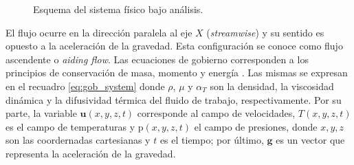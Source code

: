 \begin{figure}[H]
 \centering
 \caption{Esquema del sistema físico bajo análisis.} 
 \label{fig:sistem_domain}
\end{figure}

El flujo ocurre en la dirección paralela al eje $X$ (\textit{streamwise}) y su sentido es opuesto a la aceleración de la gravedad. Esta configuración se conoce como flujo ascendente o \textit{aiding flow}. Las ecuaciones de gobierno corresponden a los principios de conservación de masa, momento y energía \cite{zhou2024direct}. Las mismas se expresan en el recuadro \ref{eq:gob_system} donde $\rho$, $\mu$ y $\alpha_{T}$ son la densidad, la viscosidad dinámica y la difusividad térmica del fluido de trabajo, respectivamente. Por su parte, la variable $\mathbf{u}(x,y,z,t)$ corresponde al campo de velocidades, $T(x,y,z,t)$ es el campo de temperaturas y $\text{p}(x,y,z,t)$ el campo de presiones, donde $x,y,z$ son las coordernadas cartesianas y $t$ es el tiempo; por último, $\mathbf{g}$ es un vector que representa la aceleración de la gravedad.

